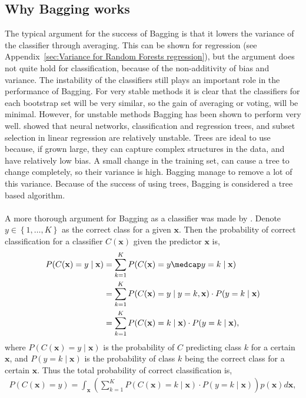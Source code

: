 \subsection{Why Bagging works}
\label{sub:Why Bagging works}
The typical argument for the success of Bagging is that it lowers the variance of the classifier through averaging. This can be shown for regression (see Appendix~\ref{sec:Variance for Random Forests regression}), but the argument does not quite hold for classification, because of the non-additivity of bias and variance. The instability of the classifiers still plays an important role in the performance of Bagging. For very stable methods it is clear that the classifiers for each bootstrap set will be very similar, so the gain of averaging or voting, will be minimal. However, for unstable methods Bagging has been shown to perform very well. \cite{Breiman1996Heur} showed that neural networks, classification and regression trees, and subset selection in linear regression are relatively unstable.
Trees are ideal to use because, if grown large, they can capture complex structures in the data, and have relatively low bias. A small change in the training set, can cause a tree to change completely, so their variance is high. Bagging manage to remove a lot of this variance. Because of the success of using trees, Bagging is considered a tree based algorithm.
\\
\\
A more thorough argument for Bagging as a classifier was made by \cite{Breiman1996}. Denote $y \in \left\{ 1, \ldots, K \right\}$ as the correct class for a given $\mathbf{x}$. Then the probability of correct classification for a classifier $C(\mathbf{x})$ given the predictor $\mathbf{x}$ is,
\begin{align}
  P(C(\mathbf{x}) = y \mid \mathbf{x})  &= \sum^{K}_{k=1} P(C(\mathbf{x})=y \medcap y = k \mid \mathbf{x}) \notag \\
  &= \sum^{K}_{k=1} P(C(\mathbf{x}) = y \mid y = k, \mathbf{x}) \cdot P(y=k \mid \mathbf{x}) \notag \\
  &= \sum^{K}_{k=1} P(C(\mathbf{x}) = k \mid \mathbf{x}) \cdot P(y=k \mid \mathbf{x}), 
\end{align}
where $P(C(\mathbf{x})=y \mid \mathbf{x})$ is the probability of $C$ predicting class $k$ for a certain $\mathbf{x}$, and $P(y=k \mid \mathbf{x})$ is the probability of class $k$ being the correct class for a certain $\mathbf{x}$. Thus the total probability of correct classification is,
\begin{align}
  P(C(\mathbf{x}) = y) = \int_{\mathbf{x}} \left(\sum^{K}_{k=1} P(C(\mathbf{x}) = k \mid \mathbf{x}) \cdot P(y=k \mid \mathbf{x})   \right) p(\mathbf{x}) d\mathbf{x},
\end{align}
